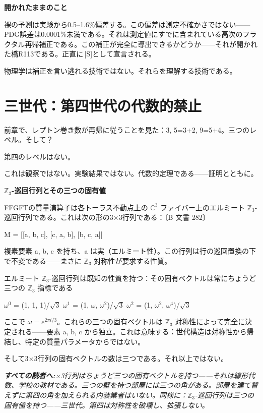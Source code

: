 \documentclass[11pt,openany]{book}
\newcommand{\status}[1]{\penalty10000\,{\tiny\textcolor{gray!70}{[#1]}}}
\newenvironment{laierspur}{%
  \par\vspace{4pt}%
  \noindent\small\itshape\color{blue!60!black}%
  \textbf{すべての読者へ:}\enspace\ignorespaces}{%
  \par\vspace{4pt}\normalsize\normalfont\normalcolor}
\begin{document}
\textbf{開かれたままのこと}

裸の予測は実験から0.5–1.6\%偏差する。この偏差は測定不確かさではない——PDG誤差は0.0001\%未満である。それは測定値にすでに含まれている高次のフラクタル再帰補正である。この補正が完全に導出できるかどうか——それが開かれた橋R113である。正直に\status{S}として宣言される。

物理学は補正を言い逃れる技術ではない。それらを理解する技術である。

\medskip

\chapter{三世代：第四世代の代数的禁止}

前章で、レプトン巻き数が再帰に従うことを見た：3, 5=3+2, 9=5+4。三つのレベル。そして？

第四のレベルはない。

これは観察ではない。実験結果ではない。代数的定理である——証明とともに。

\textbf{$\mathbb{Z}_3$-巡回行列とその三つの固有値}

FFGFTの質量演算子は各トーラス不動点上の $\mathbb{C}^3$ ファイバー上のエルミート $\mathbb{Z}_3$-巡回行列である。これは次の形の3×3行列である：〔B 文書 282〕

M = [[a, b, c],
     [c, a, b],
     [b, c, a]]

複素要素 a, b, c を持ち、a は実（エルミート性）。この行列は行の巡回置換の下で不変である——まさに $\mathbb{Z}_3$ 対称性が要求する性質。

エルミート $\mathbb{Z}_3$-巡回行列は既知の性質を持つ：その固有ベクトルは常にちょうど三つの $\mathbb{Z}_3$ 指標である

$\omega^0$ = (1, 1, 1)/$\sqrt{3}$
$\omega^1$ = (1, $\omega$, $\omega^2$)/$\sqrt{3}$
$\omega^2$ = (1, $\omega^2$, $\omega^4$)/$\sqrt{3}$

ここで $\omega = e^{2\pi i/3}$。これらの三つの固有ベクトルは $\mathbb{Z}_3$ 対称性によって完全に決定される——要素 a, b, c から独立。これは意味する：世代構造は対称性から帰結し、特定の質量パラメータからではない。

そして3×3行列の固有ベクトルの数は三つである。それ以上ではない。

\begin{laierspur}
3×3行列はちょうど三つの固有ベクトルを持つ——それは線形代数、学校の教材である。三つの壁を持つ部屋には三つの角がある。部屋を建て替えずに第四の角を加えられる内装業者はいない。同様に：$\mathbb{Z}_3$-巡回行列は三つの固有値を持つ——三世代。第四は対称性を破壊し、拡張しない。
\end{laierspur}
\end{document}
